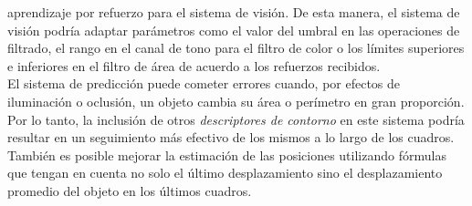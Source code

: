 aprendizaje por refuerzo para el sistema de visi\'on. De esta manera, el 
sistema de visi\'on podr\'ia adaptar par\'ametros como el valor del umbral en las
operaciones de filtrado, el rango en el canal de tono para el filtro de color o los l\'imites 
superiores e inferiores en el filtro de \'area de acuerdo a los 
refuerzos recibidos.\\
\indent El sistema de predicci\'on puede cometer errores cuando, por 
efectos de iluminaci\'on o oclusi\'on, un objeto cambia su \'area o 
per\'imetro en gran proporci\'on. Por lo tanto, la inclusi\'on de otros 
\emph{descriptores de contorno} en este sistema podr\'ia resultar en un 
seguimiento m\'as efectivo de los mismos a lo largo de los cuadros. 
Tambi\'en es posible mejorar la estimaci\'on de las posiciones utilizando 
f\'ormulas que tengan en cuenta no solo el \'ultimo desplazamiento sino 
el desplazamiento promedio del objeto en los \'ultimos cuadros.



